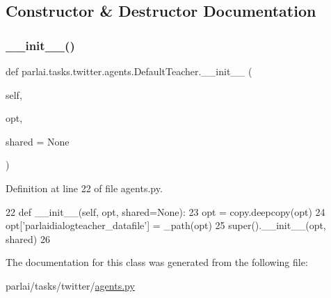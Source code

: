 \subsection{Constructor \& Destructor Documentation}
\mbox{\label{classparlai_1_1tasks_1_1twitter_1_1agents_1_1DefaultTeacher_a6351654c7d50fa7c723a2d38bd00d0d8}} 
\subsubsection{\texorpdfstring{\+\_\+\+\_\+init\+\_\+\+\_\+()}{\_\_init\_\_()}}
{\footnotesize\ttfamily def parlai.\+tasks.\+twitter.\+agents.\+Default\+Teacher.\+\_\+\+\_\+init\+\_\+\+\_\+ (\begin{DoxyParamCaption}\item[{}]{self,  }\item[{}]{opt,  }\item[{}]{shared = {\ttfamily None} }\end{DoxyParamCaption})}



Definition at line 22 of file agents.\+py.


\begin{DoxyCode}
22     \textcolor{keyword}{def }\_\_init\_\_(self, opt, shared=None):
23         opt = copy.deepcopy(opt)
24         opt[\textcolor{stringliteral}{'parlaidialogteacher\_datafile'}] = \_path(opt)
25         super().\_\_init\_\_(opt, shared)
26 \end{DoxyCode}


The documentation for this class was generated from the following file\+:\begin{DoxyCompactItemize}
\item 
parlai/tasks/twitter/\hyperlink{parlai_2tasks_2twitter_2agents_8py}{agents.\+py}\end{DoxyCompactItemize}
